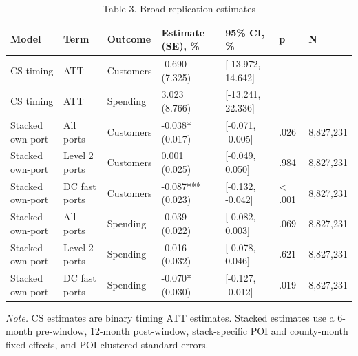 \begin{table}[!htbp]
\centering
\caption{Table 3. Broad replication estimates}
\begin{tabular}{lllllll}
\toprule
Model & Term & Outcome & Estimate (SE), \% & 95\% CI, \% & p & N \\
\midrule
CS timing & ATT & Customers & -0.690 (7.325) & [-13.972, 14.642] &  &  \\
CS timing & ATT & Spending & 3.023 (8.766) & [-13.241, 22.336] &  &  \\
Stacked own-port & All ports & Customers & -0.038* (0.017) & [-0.071, -0.005] & .026 & 8,827,231 \\
Stacked own-port & Level 2 ports & Customers & 0.001 (0.025) & [-0.049, 0.050] & .984 & 8,827,231 \\
Stacked own-port & DC fast ports & Customers & -0.087*** (0.023) & [-0.132, -0.042] & < .001 & 8,827,231 \\
Stacked own-port & All ports & Spending & -0.039 (0.022) & [-0.082, 0.003] & .069 & 8,827,231 \\
Stacked own-port & Level 2 ports & Spending & -0.016 (0.032) & [-0.078, 0.046] & .621 & 8,827,231 \\
Stacked own-port & DC fast ports & Spending & -0.070* (0.030) & [-0.127, -0.012] & .019 & 8,827,231 \\
\bottomrule
\end{tabular}
\begin{minipage}{0.95\linewidth}\footnotesize\emph{Note.} CS estimates are binary timing ATT estimates. Stacked estimates use a 6-month pre-window, 12-month post-window, stack-specific POI and county-month fixed effects, and POI-clustered standard errors.\end{minipage}
\end{table}
